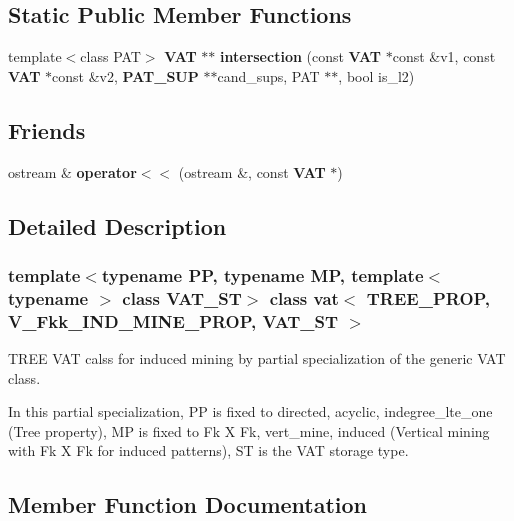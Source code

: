 \subsection*{Static Public Member Functions}
\begin{CompactItemize}
\item 
template$<$class PAT$>$ {\bf VAT} $\ast$$\ast$ {\bf intersection} (const  {\bf VAT} $\ast$const \&v1, const  {\bf VAT} $\ast$const \&v2, {\bf PAT\_\-SUP} $\ast$$\ast$cand\_\-sups, PAT $\ast$$\ast$, bool is\_\-l2)
\end{CompactItemize}
\subsection*{Friends}
\begin{CompactItemize}
\item 
ostream \& {\bf operator$<$$<$} (ostream \&, const  {\bf VAT} $\ast$)\label{classvat_3_01TREE__PROP_00_01V__Fkk__IND__MINE__PROP_00_01VAT__ST_01_4_n0}

\end{CompactItemize}


\subsection{Detailed Description}
\subsubsection*{template$<$typename PP, typename MP, template$<$ typename $>$ class VAT\_\-ST$>$ class vat$<$ TREE\_\-PROP, V\_\-Fkk\_\-IND\_\-MINE\_\-PROP, VAT\_\-ST $>$}

TREE VAT calss for induced mining by partial specialization of the generic VAT class. 

In this partial specialization, PP is fixed to directed, acyclic, indegree\_\-lte\_\-one (Tree property), MP is fixed to Fk X Fk, vert\_\-mine, induced (Vertical mining with Fk X Fk for induced patterns), ST is the VAT storage type. 



\subsection{Member Function Documentation}
